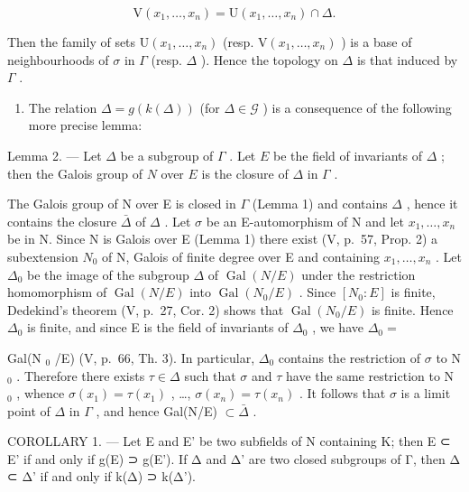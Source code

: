 \[
\mathrm{V} \left(x _ {1}, \dots , x _ {n}\right) = \mathrm{U} \left(x _ {1}, \dots , x _ {n}\right) \cap \Delta .
\]

Then the family of sets \(\mathrm{U}(x_{1},\ldots,x_{n})\) (resp. \(\mathrm{V}(x_{1},\ldots,x_{n})\) ) is a base of neighbourhoods of \(\sigma\) in \(\Gamma\) (resp. \(\Delta\) ). Hence the topology on \(\Delta\) is that induced by \(\Gamma\) .

\begin{enumerate}
\def\labelenumi{\Alph{enumi})}
\setcounter{enumi}{1}
\tightlist
\item
  The relation \(\Delta = g(k(\Delta))\) (for \(\Delta \in \mathcal{G}\) ) is a consequence of the following more precise lemma:
\end{enumerate}

Lemma 2. --- Let \(\Delta\) be a subgroup of \(\Gamma\) . Let \(E\) be the field of invariants of \(\Delta\) ; then the Galois group of \(N\) over \(E\) is the closure of \(\Delta\) in \(\Gamma\) .

The Galois group of N over E is closed in \(\Gamma\) (Lemma 1) and contains \(\Delta\) , hence it contains the closure \(\bar{\Delta}\) of \(\Delta\) . Let \(\sigma\) be an E-automorphism of N and let \(x_{1}, \ldots, x_{n}\) be in N. Since N is Galois over E (Lemma 1) there exist (V, p.~57, Prop. 2) a subextension \(N_{0}\) of N, Galois of finite degree over E and containing \(x_{1}, \ldots, x_{n}\) . Let \(\Delta_{0}\) be the image of the subgroup \(\Delta\) of \(\operatorname{Gal}(N/E)\) under the restriction homomorphism of \(\operatorname{Gal}(N/E)\) into \(\operatorname{Gal}(N_{0}/E)\) . Since \([N_{0}:E]\) is finite, Dedekind's theorem (V, p.~27, Cor. 2) shows that \(\operatorname{Gal}(N_{0}/E)\) is finite. Hence \(\Delta_{0}\) is finite, and since E is the field of invariants of \(\Delta_{0}\) , we have \(\Delta_{0}=\)

Gal(N \(_0\) /E) (V, p.~66, Th. 3). In particular, \(\Delta_0\) contains the restriction of \(\sigma\) to N \(_0\) . Therefore there exists \(\tau \in \Delta\) such that \(\sigma\) and \(\tau\) have the same restriction to N \(_0\) , whence \(\sigma(x_1) = \tau(x_1)\) , \ldots, \(\sigma(x_n) = \tau(x_n)\) . It follows that \(\sigma\) is a limit point of \(\Delta\) in \(\Gamma\) , and hence Gal(N/E) \(\subset \bar{\Delta}\) .

COROLLARY 1. --- Let E and E' be two subfields of N containing K; then E ⊂ E' if and only if g(E) ⊃ g(E'). If Δ and Δ' are two closed subgroups of Γ, then Δ ⊂ Δ' if and only if k(Δ) ⊃ k(Δ').


